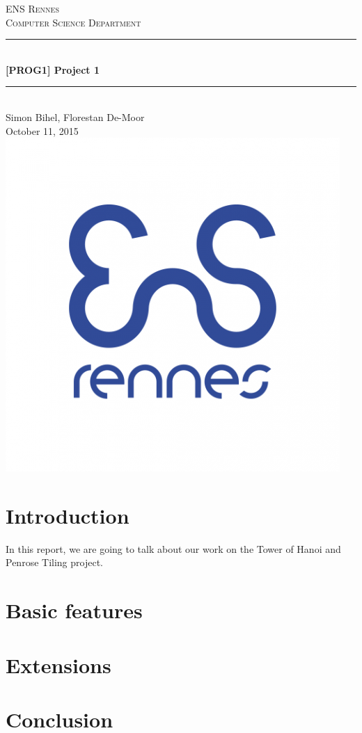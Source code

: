 \documentclass[12pt]{article}
\begin{document}
\begin{titlepage}
	
	\newcommand{\HRule}{\rule{\linewidth}{0.5mm}} %
	\center
	
	\textsc{\LARGE ENS Rennes}\\[1.5cm]
	\textsc{\Large Computer Science Department}\\[0.5cm]
	
	\HRule \\[0.4cm]
		{ \huge \bfseries [PROG1] Project 1}\\[0.4cm]
	\HRule \\[1.5cm]
	
	{\large Simon Bihel, Florestan De-Moor}\\[2cm]
	
	{\large October 11, 2015}\\[2cm]
	
	\includegraphics[scale=0.3]{ENS_Rennes.png}\\[1cm]
	\vfill
\end{titlepage}


\section{Introduction}
In this report, we are going to talk about our work on the Tower of Hanoi and Penrose Tiling project.

\section{Basic features}

\section{Extensions}

\section{Conclusion}
\end{document}
